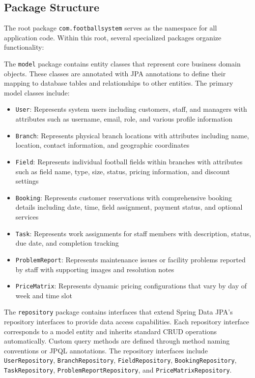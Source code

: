 \subsection{Package Structure}

The root package \texttt{com.footballsystem} serves as the namespace for all application code. Within this root, several specialized packages organize functionality:

The \texttt{model} package contains entity classes that represent core business domain objects. These classes are annotated with JPA annotations to define their mapping to database tables and relationships to other entities. The primary model classes include:
\begin{itemize}
    \item \texttt{User}: Represents system users including customers, staff, and managers with attributes such as username, email, role, and various profile information
    \item \texttt{Branch}: Represents physical branch locations with attributes including name, location, contact information, and geographic coordinates
    \item \texttt{Field}: Represents individual football fields within branches with attributes such as field name, type, size, status, pricing information, and discount settings
    \item \texttt{Booking}: Represents customer reservations with comprehensive booking details including date, time, field assignment, payment status, and optional services
    \item \texttt{Task}: Represents work assignments for staff members with description, status, due date, and completion tracking
    \item \texttt{ProblemReport}: Represents maintenance issues or facility problems reported by staff with supporting images and resolution notes
    \item \texttt{PriceMatrix}: Represents dynamic pricing configurations that vary by day of week and time slot
\end{itemize}

The \texttt{repository} package contains interfaces that extend Spring Data JPA's repository interfaces to provide data access capabilities. Each repository interface corresponds to a model entity and inherits standard CRUD operations automatically. Custom query methods are defined through method naming conventions or JPQL annotations. The repository interfaces include \texttt{UserRepository}, \texttt{BranchRepository}, \texttt{FieldRepository}, \texttt{BookingRepository}, \texttt{TaskRepository}, \texttt{ProblemReportRepository}, and \texttt{PriceMatrixRepository}.

